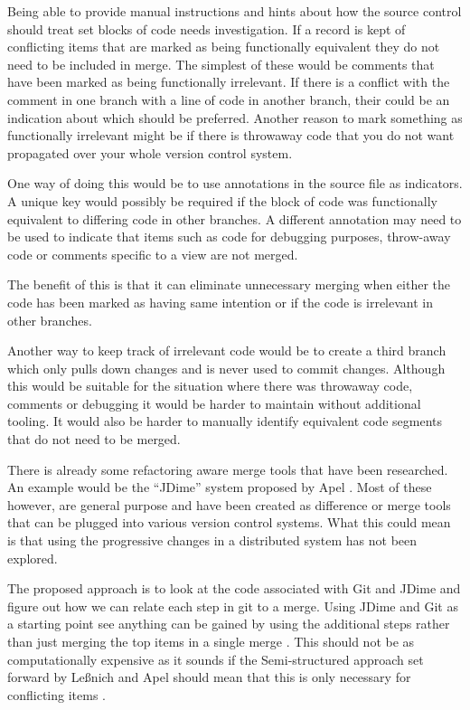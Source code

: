 \documentclass[12pt]{CRPITStyle}
\renewcommand{\cite}{\citep}
\begin{document}
Being able to provide manual instructions and hints about how the source control should treat set blocks of code needs investigation. If a record is kept of conflicting items that are marked as being functionally equivalent they do not need to be included in merge. The simplest of these would be comments that have been marked as being functionally irrelevant. If there is a conflict with the comment in one branch with a line of code in another branch, their could be an indication about which should be preferred. Another reason to mark something as functionally irrelevant might be if there is throwaway code that you do not want propagated over your whole version control system. 

One way of doing this would be to use annotations in the source file as indicators. A unique key would possibly be required if the block of code was functionally equivalent to differing code in other branches. A different annotation may need to be used to indicate that items such as code for debugging purposes, throw-away code or comments specific to a view are not merged.

The benefit of this is that it can eliminate unnecessary merging when either the code has been marked as having same intention or if the code is irrelevant in other branches. 

Another way to keep track of irrelevant code would be to create a third branch which only pulls down changes and is never used to commit changes. Although this would be suitable for the situation where there was throwaway code, comments or debugging it would be harder to maintain without additional tooling. It would also be harder to manually identify equivalent code segments that do not need to be merged. 

There is already some refactoring aware merge tools that have been researched. An example would be the ``JDime'' system proposed by Apel \cite{Apel2011}. Most of these however, are general purpose and have been created as difference or merge tools that can be plugged into various version control systems. What this could mean is that using the progressive changes in a distributed system has not been explored. 

The proposed approach is to look at the code associated with Git and JDime and figure out how we can relate each step in git to a merge. Using JDime and Git as a starting point see anything can be gained by using the additional steps rather than just merging the top items in a single merge . This should not be as computationally expensive as it sounds if the Semi-structured approach set forward by Le{\ss}nich and Apel should mean that this is only necessary for conflicting items \cite{LeBenich2012} \cite{Apel2011}. 
\end{document}
